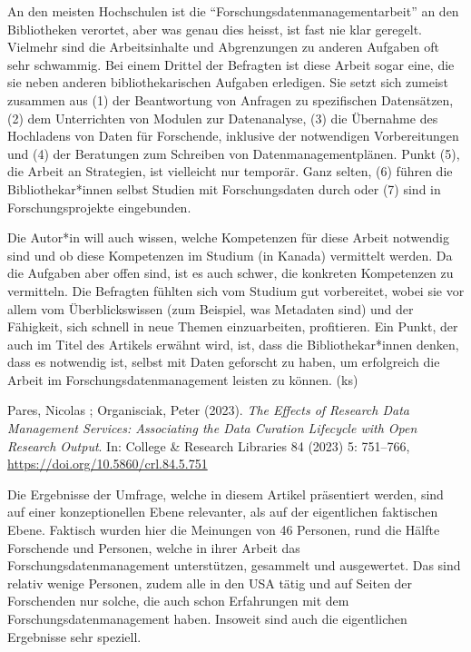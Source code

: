 \documentclass[a4paper,
fontsize=11pt,
oneside,
numbers=noperiodatend,
parskip=half-,
bibliography=totoc,
final
]{scrartcl}
\begin{document}
An den meisten Hochschulen ist die
\enquote{Forschungsdatenmanagementarbeit} an den Bibliotheken verortet,
aber was genau dies heisst, ist fast nie klar geregelt. Vielmehr sind
die Arbeitsinhalte und Abgrenzungen zu anderen Aufgaben oft sehr
schwammig. Bei einem Drittel der Befragten ist diese Arbeit sogar eine,
die sie neben anderen bibliothekarischen Aufgaben erledigen. Sie setzt
sich zumeist zusammen aus (1) der Beantwortung von Anfragen zu
spezifischen Datensätzen, (2) dem Unterrichten von Modulen zur
Datenanalyse, (3) die Übernahme des Hochladens von Daten für Forschende,
inklusive der notwendigen Vorbereitungen und (4) der Beratungen zum
Schreiben von Datenmanagementplänen. Punkt (5), die Arbeit an
Strategien, ist vielleicht nur temporär. Ganz selten, (6) führen die
Bibliothekar*innen selbst Studien mit Forschungsdaten durch oder (7)
sind in Forschungsprojekte eingebunden.

Die Autor*in will auch wissen, welche Kompetenzen für diese Arbeit
notwendig sind und ob diese Kompetenzen im Studium (in Kanada)
vermittelt werden. Da die Aufgaben aber offen sind, ist es auch schwer,
die konkreten Kompetenzen zu vermitteln. Die Befragten fühlten sich vom
Studium gut vorbereitet, wobei sie vor allem vom Überblickswissen (zum
Beispiel, was Metadaten sind) und der Fähigkeit, sich schnell in neue
Themen einzuarbeiten, profitieren. Ein Punkt, der auch im Titel des
Artikels erwähnt wird, ist, dass die Bibliothekar*innen denken, dass es
notwendig ist, selbst mit Daten geforscht zu haben, um erfolgreich die
Arbeit im Forschungsdatenmanagement leisten zu können. (ks)

Pares, Nicolas ; Organisciak, Peter (2023). \emph{The Effects of
Research Data Management Services: Associating the Data Curation
Lifecycle with Open Research Output}. In: College \& Research Libraries
84 (2023) 5: 751--766, \url{https://doi.org/10.5860/crl.84.5.751}

Die Ergebnisse der Umfrage, welche in diesem Artikel präsentiert werden,
sind auf einer konzeptionellen Ebene relevanter, als auf der
eigentlichen faktischen Ebene. Faktisch wurden hier die Meinungen von 46
Personen, rund die Hälfte Forschende und Personen, welche in ihrer
Arbeit das Forschungsdatenmanagement unterstützen, gesammelt und
ausgewertet. Das sind relativ wenige Personen, zudem alle in den USA
tätig und auf Seiten der Forschenden nur solche, die auch schon
Erfahrungen mit dem Forschungsdatenmanagement haben. Insoweit sind auch
die eigentlichen Ergebnisse sehr speziell.
\end{document}
